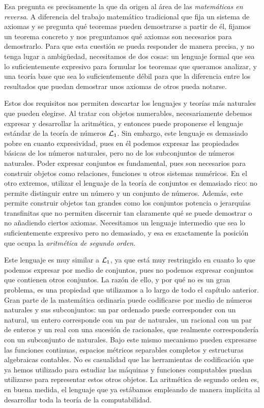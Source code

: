 Esa pregunta es precisamente la que da origen al área de las \emph{matemáticas en reversa}. A diferencia del trabajo matemático tradicional que fija un sistema de axiomas y se pregunta qué teoremas pueden demostrarse a partir de él, fijamos un teorema concreto y nos preguntamos qué axiomas son necesarios para demostrarlo. Para que esta cuestión se pueda responder de manera precisa, y no tenga lugar a ambigüedad, necesitamos de dos cosas: un lenguaje formal que sea lo suficientemente expresivo para formular los teoremas que queramos analizar, y una teoría base que sea lo suficientemente débil para que la diferencia entre los resultados que puedan demostrar unos axiomas de otros pueda notarse.

Estos dos requisitos nos permiten descartar los lenguajes y teorías más naturales que pueden elegirse. Al tratar con objetos numerables, necesariamente debemos expresar y desarrollar la aritmética, y entonces puede proponerse el lenguaje estándar de la teoría de números $\ARITMETICA[1]$. Sin embargo, este lenguaje es demasiado pobre en cuanto expresividad, pues en él podemos expresar las propiedades básicas de los números naturales, pero no de los subconjuntos de números naturales. Poder expresar conjuntos es fundamental, pues son necesarios para construir objetos como relaciones, funciones u otros sistemas numéricos. En el otro extremos, utilizar el lenguaje de la teoría de conjuntos es demasiado rico: no permite distinguir entre un número y un conjunto de números. Además, este permite construir objetos tan grandes como los conjuntos potencia o jerarquías transfinitas que no permiten discernir tan claramente qué se puede demostrar o no añadiendo ciertos axiomas. Necesitamos un lenguaje intermedio que sea lo suficientemente expresivo pero no demasiado, y esa es exactamente la posición que ocupa la \emph{aritmética de segundo orden}.

Este lenguaje es muy similar a $\ARITMETICA[1]$, ya que está muy restringido en cuanto lo que podemos expresar por medio de conjuntos, pues no podemos expresar conjuntos que contienen otros conjuntos. La razón de ello, y por qué no es un gran problema, es una propiedad que utilizamos a lo largo de todo el capítulo anterior. Gran parte de la matemática ordinaria puede codificarse por medio de números naturales y sus subconjuntos: un par ordenado puede corresponder con un natural, un entero corresponde con un par de naturales, un racional con un par de enteros y un real con una sucesión de racionales, que realmente correspondería con un subconjunto de naturales. Bajo este mismo mecanismo pueden expresarse las funciones continuas, espacios métricos separables completos y estructuras algebraicas contables. No es casualidad que las herramientas de codificación que ya hemos utilizado para estudiar las máquinas y funciones computables puedan utilizarse para representar estos otros objetos. La aritmética de segundo orden es, en buena medida, el lenguaje que ya estábamos empleando de manera implícita al desarrollar toda la teoría de la computabilidad.

